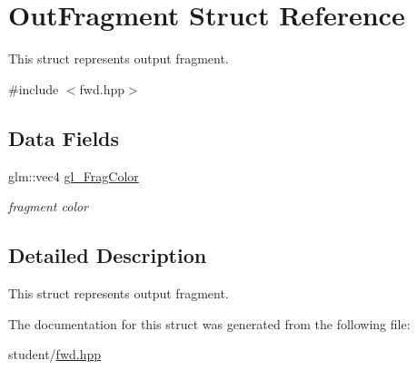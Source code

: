 \hypertarget{structOutFragment}{}\section{Out\+Fragment Struct Reference}
\label{structOutFragment}


This struct represents output fragment.  




{\ttfamily \#include $<$fwd.\+hpp$>$}

\subsection*{Data Fields}
\begin{DoxyCompactItemize}
\item 
\mbox{\label{structOutFragment_a9670bf5a31a5c23fccdbeaad959cc3cf}} 
glm\+::vec4 \hyperlink{structOutFragment_a9670bf5a31a5c23fccdbeaad959cc3cf}{gl\+\_\+\+Frag\+Color}
\begin{DoxyCompactList}\small\item\em fragment color \end{DoxyCompactList}\end{DoxyCompactItemize}


\subsection{Detailed Description}
This struct represents output fragment. 

The documentation for this struct was generated from the following file\+:\begin{DoxyCompactItemize}
\item 
student/\hyperlink{fwd_8hpp}{fwd.\+hpp}\end{DoxyCompactItemize}
